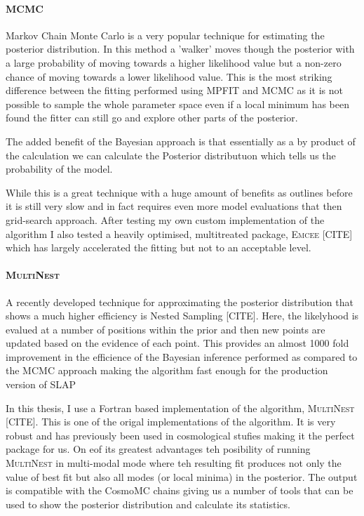 \paragraph{MCMC}
Markov Chain Monte Carlo is a very popular technique for estimating the posterior distribution. In this method a 'walker' moves though the posterior with a large probability of moving towards a higher likelihood value but a non-zero chance of moving towards a lower likelihood value. This is the most striking difference between the fitting performed using MPFIT and MCMC as it is not possible to sample the whole parameter space even if a local minimum has been found the fitter can still go and explore other parts of the posterior.

The added benefit of the Bayesian approach is that essentially as a by product of the calculation we can calculate the Posterior distributuon which tells us the probability of the model.

While this is a great technique with a huge amount of benefits as outlines before it is still very slow and in fact requires even more model evaluations that then grid-search approach. After testing my own custom implementation of the algorithm I also tested a heavily optimised, multitreated package, \textsc{Emcee} [CITE] which has largely accelerated the fitting but not to an acceptable level.

\paragraph{\textsc{MultiNest}}
A recently developed technique for approximating the posterior distribution that shows a much higher efficiency is Nested Sampling [CITE]. Here, the likelyhood is evalued at a number of positions within the prior and then new points are updated based on the evidence of each point. This provides an almost 1000 fold improvement in the efficience of the Bayesian inference performed as compared to the MCMC approach making the algorithm fast enough for the production version of \textsc{SLAP}

In this thesis, I use a Fortran based implementation of the algorithm, \textsc{MultiNest} [CITE]. This is one of the origal implementations of the algorithm. It is very robust and has previously been used in cosmological stufies making it the perfect package for us. On eof its greatest advantages teh posibility of running \textsc{MultiNest} in multi-modal mode where teh resulting fit produces not only the value of best fit but also all modes (or local minima) in the posterior. The output is compatible with the CosmoMC chains giving us a number of tools that can be used to show the posterior distribution and calculate its statistics.

